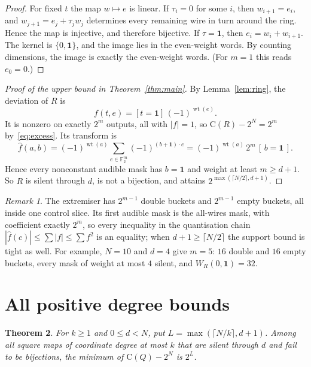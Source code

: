 \documentclass[11pt]{article}
\newtheorem{theorem}{Theorem}
\theoremstyle{definition}
\theoremstyle{remark}
\newtheorem{remark}[theorem]{Remark}
\newcommand{\F}{\mathbb{F}_2}
\newcommand{\wt}{\operatorname{wt}}
\newcommand{\W}{W}
\newcommand{\Coll}{\mathrm{C}}
\newcommand{\one}{\mathbf{1}}
\begin{document}
\begin{proof}
For fixed $t$ the map $w\mapsto e$ is linear. If $\tau_i=0$ for some $i$, then
$w_{i+1}=e_i$, and $w_{j+1}=e_j+\tau_jw_j$ determines every remaining wire in
turn around the ring. Hence the map is injective, and therefore bijective. If
$\tau=\one$, then $e_i=w_i+w_{i+1}$. The kernel is $\{0,\one\}$, and the image
lies in the even-weight words. By counting dimensions, the image is exactly the
even-weight words. (For $m=1$ this reads $e_0=0$.)
\end{proof}

\begin{proof}[Proof of the upper bound in Theorem~\ref{thm:main}]
By Lemma~\ref{lem:ring}, the deviation of $R$ is
\[ f(t,e)=[t=\one]\,(-1)^{\wt(e)} . \]
It is nonzero on exactly $2^m$ outputs, all
with $|f|=1$, so $\Coll(R)-2^N=2^m$ by~\eqref{eq:excess}. Its transform is
\[
  \hat f(a,b)=(-1)^{\wt(a)}\sum_{e\in\F^m}(-1)^{(b+\one)\cdot e}
  =(-1)^{\wt(a)}\,2^m\,[\,b=\one\,].
\]
Hence every nonconstant audible mask has $b=\one$ and weight at least
$m\ge d+1$. So $R$ is silent through $d$, is not a bijection, and attains
$2^{\max(\lceil N/2\rceil,d+1)}$.
\end{proof}

\begin{remark}
The extremiser has $2^{m-1}$ double buckets and $2^{m-1}$ empty buckets, all inside one
control slice. Its first audible mask is the all-wires mask, with coefficient
exactly $2^m$, so every inequality in the quantisation chain
$|\hat f(c)|\le\sum|f|\le\sum f^2$ is an equality; when $d+1\ge\lceil N/2\rceil$
the support bound is tight as well. For example,
$N=10$ and $d=4$ give $m=5$: $16$ double and $16$ empty buckets, every mask of
weight at most $4$ silent, and $\W_R(0,\one)=32$.
\end{remark}

\section{All positive degree bounds}\label{sec:all-degrees}

\begin{theorem}\label{thm:all-degrees}
For $k\ge1$ and $0\le d<N$, put $L=\max(\lceil N/k\rceil,d+1)$.
Among all square maps of coordinate degree at most $k$ that are silent
through $d$ and fail to be bijections, the minimum of $\Coll(Q)-2^N$ is $2^L$.
\end{theorem}
\end{document}
